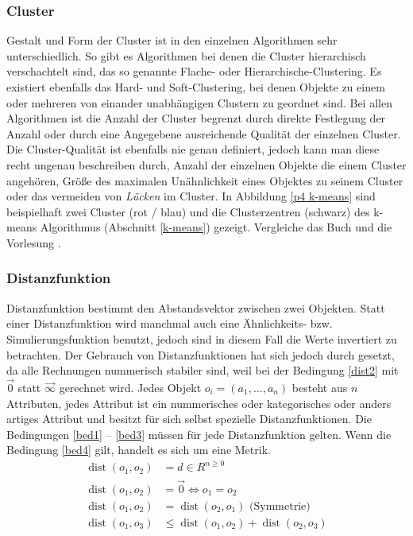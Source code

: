 \documentclass[12pt,journal,compsoc]{IEEEtran}
\DeclareMathOperator{\dist}{dist}
\begin{document}
\subsubsection{Cluster} \label{cluster}

 Gestalt und Form der Cluster ist in den einzelnen Algorithmen sehr 
unterschiedlich. So gibt es Algorithmen bei denen die Cluster hierarchisch verschachtelt
sind, das so genannte Flache- oder Hierarchische-Clustering. Es existiert ebenfalls das Hard- 
und Soft-Clustering, bei denen Objekte zu einem oder mehreren von einander unabhängigen Clustern 
zu geordnet sind. Bei allen Algorithmen ist die Anzahl der Cluster begrenzt durch direkte Festlegung 
der Anzahl oder durch eine Angegebene ausreichende Qualität der einzelnen Cluster. Die Cluster-Qualität
ist ebenfalls nie genau definiert, jedoch kann man diese recht ungenau beschreiben durch, Anzahl der 
einzelnen Objekte die einem Cluster angehören, Größe des maximalen Unähnlichkeit eines Objektes zu seinem Cluster oder
das vermeiden von \emph{Lücken} im Cluster. In Abbildung \ref{p4 k-means} sind beispielhaft zwei Cluster (rot / blau) 
und die Clusterzentren (schwarz) des k-means Algorithmus (Abschnitt \ref{k-means}) gezeigt. Vergleiche das Buch \cite{ester2000knowledge} 
und die Vorlesung \cite{dwh}.



\subsubsection{Distanzfunktion} \label{distanzfunktion}
 Distanzfunktion bestimmt den Abstandsvektor zwischen zwei Objekten. Statt einer Distanzfunktion
wird manchmal auch eine Ähnlichkeits- bzw. Simulierungsfunktion benutzt, jedoch sind in diesem
Fall die Werte invertiert zu betrachten. Der Gebrauch von Distanzfunktionen hat sich jedoch durch
gesetzt, da alle Rechnungen nummerisch stabiler sind, weil bei der Bedingung \ref{dist2} mit $\vec{0}$ 
statt $\vec{\infty}$ gerechnet wird. Jedes Objekt $o_i = (a_1, \ldots, a_n)$ besteht aus $n$ Attributen, jedes 
Attribut ist ein nummerisches oder kategorisches oder anders artiges Attribut und besitzt für sich selbst 
spezielle Distanzfunktionen. Die Bedingungen \ref{bed1} -- \ref{bed3} müssen für jede 
Distanzfunktion gelten. Wenn die Bedingung \ref{bed4} gilt, handelt es sich um eine Metrik.
\begin{align}
\dist(o_1, o_2) &= d \in R^{n\geq 0} \label{bed1}\\
\dist(o_1, o_2) &= \vec{0} \Leftrightarrow o_1 = o_2 \label{bed2}\\
\dist(o_1, o_2) &= \dist(o_2, o_1) \mbox{ (Symmetrie)} \label{bed3}\\
\dist(o_1, o_3) &\leq \dist(o_1, o_2) + \dist(o_2, o_3) \label{bed4}
\end{align} 
\end{document}
